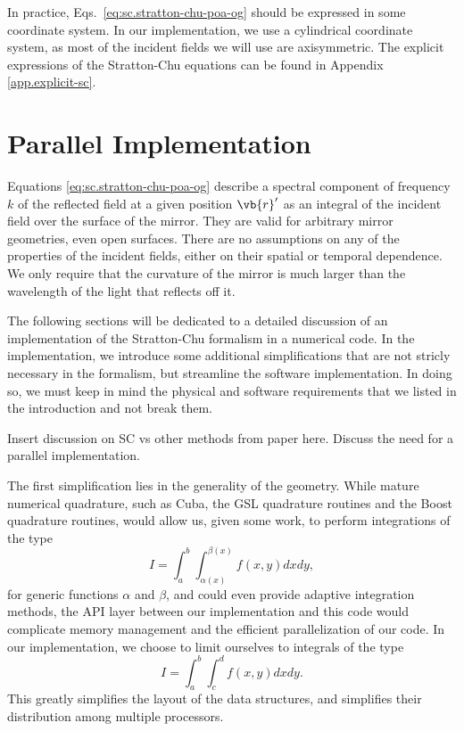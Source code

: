 \documentclass[11pt,SymmetricalJury]{inrsthesis/inrsthesis}
\begin{document}
In practice, Eqs.~\eqref{eq:sc.stratton-chu-poa-og} should be expressed in some
coordinate system. In our implementation, we use a cylindrical coordinate
system, as most of the incident fields we will use are axisymmetric. The
explicit expressions of the Stratton-Chu equations can be found in Appendix
\ref{app.explicit-sc}.

\section{Parallel Implementation}

Equations \eqref{eq:sc.stratton-chu-poa-og} describe a spectral component of
frequency $k$ of the reflected field at a given position $\vb{r}'$ as an
integral of the incident field over the surface of the mirror. They are valid
for arbitrary mirror geometries, even open surfaces. There are no assumptions on
any of the properties of the incident fields, either on their spatial or
temporal dependence. We only require that the curvature of the mirror is much
larger than the wavelength of the light that reflects off it.

The following sections will be dedicated to a detailed discussion of an
implementation of the Stratton-Chu formalism in a numerical code. In the
implementation, we introduce some additional simplifications that are not
stricly necessary in the formalism, but streamline the software implementation.
In doing so, we must keep in mind the physical and software requirements that we
listed in the introduction and not break them.

{Insert discussion on SC vs other methods from paper here. Discuss the
need for a parallel implementation.}

The first simplification lies in the generality of the geometry. While mature
numerical quadrature, such as Cuba, the GSL quadrature routines and the Boost
quadrature routines, would allow us, given some work, to perform integrations of
the type
  \begin{equation}
    I=\int_a^b\int_{\alpha(x)}^{\beta(x)}f(x,y)dxdy,
  \end{equation}
for generic functions $\alpha$ and $\beta$, and could even provide adaptive
integration methods, the API layer between our implementation and this code
would complicate memory management and the efficient parallelization of our
code. In our implementation, we choose to limit ourselves to integrals of the
type
  \begin{equation}
    I=\int_a^b\int_c^d f(x,y)dxdy.
  \end{equation}
This greatly simplifies the layout of the data structures, and simplifies their
distribution among multiple processors.
\end{document}
